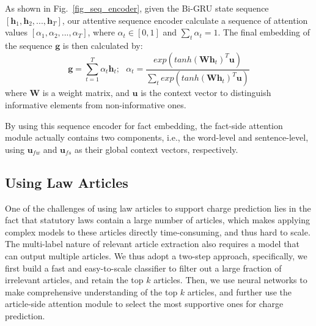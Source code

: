 As shown in Fig.~\ref{fig_seq_encoder}, given the Bi-GRU state sequence $[\mathbf{h}_1, \mathbf{h}_2, ..., \mathbf{h}_T]$, 
our attentive sequence encoder calculate a sequence of attention values $[\alpha_1, \alpha_2, ..., \alpha_T]$, 
where $\alpha_t \in [0, 1]$ and $\sum_t{\alpha_t}=1$. The final embedding of the sequence $\mathbf{g}$ is then calculated by:
% 
\begin{equation}
\mathbf{g} = \sum_{t=1}^{T}{\alpha_t \mathbf{h}_t};\ \ \ 
\alpha_t=\frac{exp(tanh(\mathbf{W} \mathbf{h}_t)^T \mathbf{u})}{\sum_t{exp(tanh(\mathbf{W} \mathbf{h}_t)^T \mathbf{u})}}
\label{seq_embed}
\end{equation}
where $\mathbf{W}$ is a weight matrix, and $\mathbf{u}$ is the context vector to distinguish informative elements from non-informative ones. 

By using this sequence encoder for fact embedding, the fact-side attention module actually contains two components, i.e., the word-level and sentence-level, using $\mathbf{u}_{fw}$ and $\mathbf{u}_{fs}$ as their global context vectors, respectively.


\subsection{Using Law Articles} 
One of the challenges of using law articles to support charge prediction lies in the fact that statutory laws contain a large number of articles, which makes applying complex models to these articles directly time-consuming, and thus hard to scale.
The multi-label nature of relevant article extraction also requires a model that can output multiple articles.
%
We thus adopt a two-step approach, %
specifically, we first build a fast and easy-to-scale classifier to filter out a large fraction of irrelevant articles, and retain the top $k$ articles. Then, we use neural networks to make comprehensive understanding of the top $k$ articles, and further use the article-side attention module to select the most supportive ones for charge prediction.

